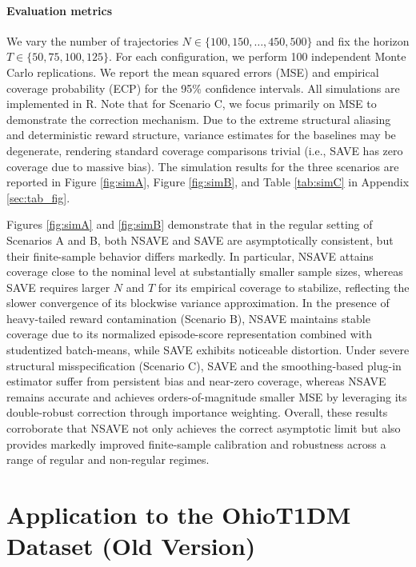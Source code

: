 \documentclass[12pt]{article}
\theoremstyle{remark}\newtheorem{remark}[theorem]{Remark}\theoremstyle{plain}
\begin{document}
\paragraph{Evaluation metrics}\label{sec:sim_metrics}

We vary the number of trajectories $N \in \{100, 150, \ldots, 450, 500\}$ and fix the horizon $T \in \{50, 75, 100, 125\}$. For each configuration, we perform 100 independent Monte Carlo replications.
We report the mean squared
errors (MSE) and empirical coverage probability (ECP) for the 95\% confidence intervals.
All simulations are implemented in \textsf{R}.
{Note that for Scenario C}, we focus primarily on MSE to demonstrate the correction mechanism. Due to the extreme structural aliasing and deterministic reward structure, variance estimates for the baselines may be degenerate, rendering standard coverage comparisons trivial (i.e., SAVE has zero coverage due to massive bias).
The simulation results for the three scenarios are reported in Figure \ref{fig:simA}, Figure \ref{fig:simB}, and Table \ref{tab:simC} in Appendix \ref{sec:tab_fig}.

Figures \ref{fig:simA} and \ref{fig:simB} demonstrate that in the regular setting of Scenarios A and B, both NSAVE and SAVE are asymptotically consistent, but their finite-sample behavior differs markedly. In particular, NSAVE attains coverage close to the nominal level at substantially smaller sample sizes, whereas SAVE requires larger $N$ and $T$ for its empirical coverage to stabilize, reflecting the slower convergence of its blockwise variance approximation. In the presence of heavy-tailed reward contamination (Scenario B), NSAVE maintains stable coverage due to its normalized episode-score representation combined with studentized batch-means, while SAVE exhibits noticeable distortion. Under severe structural misspecification (Scenario C), SAVE and the smoothing-based plug-in estimator suffer from persistent bias and near-zero coverage, whereas NSAVE remains accurate and achieves orders-of-magnitude smaller MSE by leveraging its double-robust correction through importance weighting. Overall, these results corroborate that NSAVE not only achieves the correct asymptotic limit but also provides markedly improved finite-sample calibration and robustness across a range of regular and non-regular regimes.

\section{Application to the OhioT1DM Dataset (Old Version)}
\label{sec:realdata_old}
\end{document}
